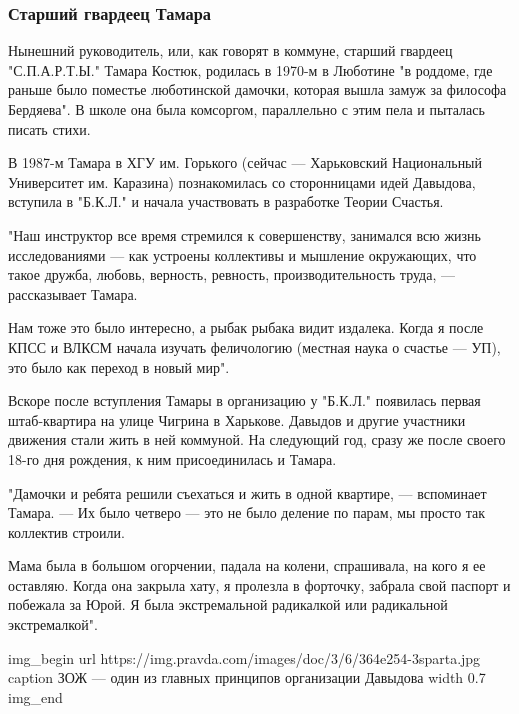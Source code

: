  
 
 

\subsubsection{Старший гвардеец Тамара}
\label{sec:25_10_2019.news.pravda_com_ua.SPARTA.starshii_gvardeec_TAMARA}

Нынешний руководитель, или, как говорят в коммуне, старший гвардеец
"С.П.А.Р.Т.Ы." Тамара Костюк, родилась в 1970-м в Люботине "в роддоме, где
раньше было поместье люботинской дамочки, которая вышла замуж за философа
Бердяева". В школе она была комсоргом, параллельно с этим пела и пыталась
писать стихи.

В 1987-м Тамара в ХГУ им. Горького (сейчас --- Харьковский Национальный
Университет им. Каразина) познакомилась со сторонницами идей Давыдова, вступила
в "Б.К.Л." и начала участвовать в разработке Теории Счастья.

"Наш инструктор все время стремился к совершенству, занимался всю жизнь
исследованиями --- как устроены коллективы и мышление окружающих, что такое
дружба, любовь, верность, ревность, производительность труда, --- рассказывает
Тамара.

Нам тоже это было интересно, а рыбак рыбака видит издалека. Когда я после КПСС
и ВЛКСМ начала изучать феличологию (местная наука о счастье --- УП), это было как
переход в новый мир".

Вскоре после вступления Тамары в организацию у "Б.К.Л." появилась первая
штаб-квартира на улице Чигрина в Харькове. Давыдов и другие участники движения
стали жить в ней коммуной. На следующий год, сразу же после своего 18-го дня
рождения, к ним присоединилась и Тамара.

"Дамочки и ребята решили съехаться и жить в одной квартире, --- вспоминает
Тамара. --- Их было четверо --- это не было деление по парам, мы просто так
коллектив строили. 

Мама была в большом огорчении, падала на колени, спрашивала, на кого я ее
оставляю. Когда она закрыла хату, я пролезла в форточку, забрала свой паспорт и
побежала за Юрой. Я была экстремальной радикалкой или радикальной
экстремалкой".

\ifcmt
img_begin 
	url https://img.pravda.com/images/doc/3/6/364e254-3sparta.jpg
	caption ЗОЖ --- один из главных принципов организации Давыдова
	width 0.7
img_end
\fi

